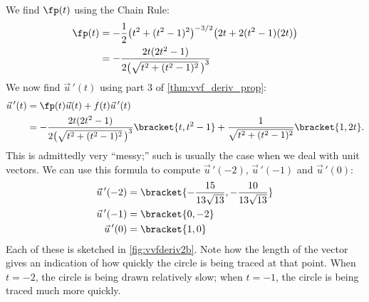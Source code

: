 \begin{example}
\begin{enumerate}
We find $\fp(t)$ using the Chain Rule:
\begin{align*}
\fp(t) &= -\frac12\bigl(t^2+(t^2-1)^2\bigr)^{-3/2}\bigl(2t+2(t^2-1)(2t)\bigr)\\
			&= -\frac{2t(2t^2-1)}{2\bigl(\sqrt{t^2+(t^2-1)^2}\,\bigr)^3}
\end{align*}
We now find $\vec u\,'(t)$ using part 3 of \autoref{thm:vvf_deriv_prop}:
\begin{align*}
\vec u\,'(t) &=  \fp(t)\vec u(t) + f(t)\vec u\,'(t) \\
				&=  -\frac{2t(2t^2-1)}{2\bigl(\sqrt{t^2+(t^2-1)^2}\,\bigr)^3}\bracket{t,t^2-1}+ \frac{1}{\sqrt{t^2+(t^2-1)^2}}\bracket{1,2t}.
\end{align*}
This is admittedly very ``messy;'' such is usually the case when we deal with unit vectors. We can use this formula to compute $\vec u\,'(-2)$, $\vec u\,'(-1)$ and $\vec u\,'(0)$:
\begin{align*}
\vec u\,'(-2) &=\bracket{-\frac{15}{13 \sqrt{13}},-\frac{10}{13
   \sqrt{13}}}%
   \\
\vec u\,'(-1) &=\bracket{0,-2}\\
\vec u\,'(0) &=\bracket{1,0}
\end{align*}
%
%
%
Each of these is sketched in \autoref{fig:vvfderiv2b}. Note how the length of the vector gives an indication of how quickly the circle is being traced at that point. When $t=-2$, the circle is being drawn relatively slow; when $t=-1$, the circle is being traced much more quickly.
\end{enumerate}
\end{example}

